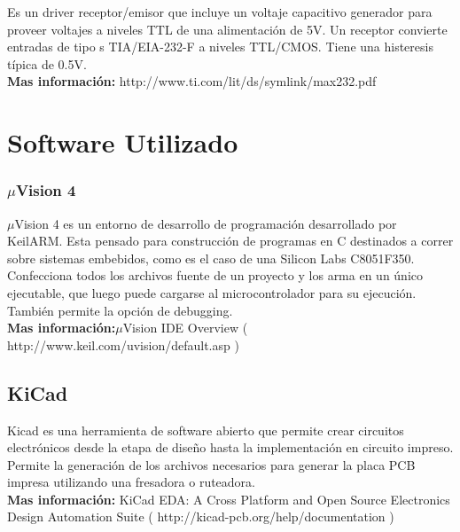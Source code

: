 \documentclass{article}
\theoremstyle{definition}
\theoremstyle{remark}
\begin{document}
Es un driver receptor/emisor que incluye un voltaje capacitivo generador para proveer voltajes a niveles TTL de una alimentación de 5V. Un receptor convierte entradas de tipo s TIA/EIA-232-F a niveles TTL/CMOS. Tiene una histeresis típica de 0.5V. \\


\textbf{Mas información:} http://www.ti.com/lit/ds/symlink/max232.pdf







\section{Software Utilizado} %
\label{sec:sofware_utilizado}


\subsubsection{$\mu$Vision 4} %
\label{ssub:uvision_4}

$\mu$Vision 4 es un entorno de desarrollo de programación desarrollado por KeilARM. Esta pensado para construcción de programas en C destinados a correr sobre sistemas embebidos, como es el caso de una Silicon Labs C8051F350. Confecciona todos los archivos fuente de un proyecto y los arma en un único ejecutable, que luego puede cargarse al microcontrolador para su ejecución. También permite la opción de debugging. \\

\textbf{Mas información:}$\mu$Vision IDE Overview ( http://www.keil.com/uvision/default.asp )



\subsection{KiCad} %
\label{sub:kicad}

Kicad es una herramienta de software abierto que permite crear circuitos electrónicos desde la etapa de diseño hasta la implementación en circuito impreso. Permite la generación de los archivos necesarios para generar la placa PCB impresa utilizando una fresadora o ruteadora.  \\


\textbf{Mas información:} KiCad EDA: A Cross Platform and Open Source Electronics Design Automation Suite ( http://kicad-pcb.org/help/documentation )
\end{document}

